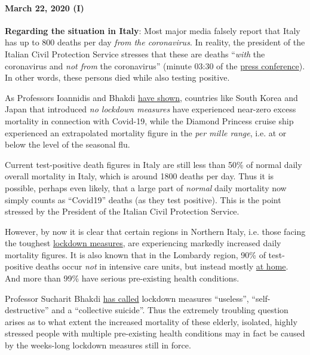 \hypertarget{march-22-2020-i}{%
\paragraph{March 22, 2020 (I)}\label{march-22-2020-i}}

\textbf{Regarding the situation in Italy}: Most major media falsely
report that Italy has up to 800 deaths per day \emph{from the
coronavirus}. In reality, the president of the Italian Civil Protection
Service stresses that these are deaths ``\emph{with} the coronavirus and
\emph{not from} the coronavirus'' (minute 03:30 of the
\href{https://youtu.be/0M4kbPDHGR0?t=210}{press conference}). In other
words, these persons died while also testing positive.

As Professors Ioannidis and Bhakdi
\href{https://www.statnews.com/2020/03/17/a-fiasco-in-the-making-as-the-coronavirus-pandemic-takes-hold-we-are-making-decisions-without-reliable-data/}{have
shown}, countries like South Korea and Japan that introduced \emph{no
lockdown measures} have experienced near-zero excess mortality in
connection with Covid-19, while the Diamond Princess cruise ship
experienced an extra­polated mortality figure in the \emph{per mille
range}, i.e. at or below the level of the seasonal flu.

Current test-positive death figures in Italy are still less than 50\% of
normal daily overall mortality in Italy, which is around 1800 deaths per
day. Thus it is possible, perhaps even likely, that a large part of
\emph{normal} daily mortality now simply counts as ``Covid19'' deaths
(as they test positive). This is the point stressed by the President of
the Italian Civil Protection Service.

However, by now it is clear that certain regions in Northern Italy, i.e.
those facing the toughest
\href{https://en.wikipedia.org/wiki/2020_Italy_coronavirus_lockdown}{lockdown
measures}, are experiencing markedly increased daily mortality figures.
It is also known that in the Lombardy region, 90\% of test-positive
deaths occur \emph{not} in intensive care units, but instead mostly
\href{https://www.tgcom24.mediaset.it/cronaca/coronavirus-in-lombardia-9-morti-su-10-mai-giunti-in-terapia-intensiva_16362350-202002a.shtml}{at
home}. And more than 99\% have serious pre-existing health conditions.

Professor Sucharit Bhakdi
\href{https://www.youtube.com/watch?v=JBB9bA-gXL4}{has called} lockdown
measures ``useless'', ``self-destructive'' and a ``collective suicide''.
Thus the extremely troubling question arises as to what extent the
increased mortality of these elderly, isolated, highly stressed people
with multiple pre-existing health conditions may in fact be caused by
the weeks-long lockdown measures still in force.

